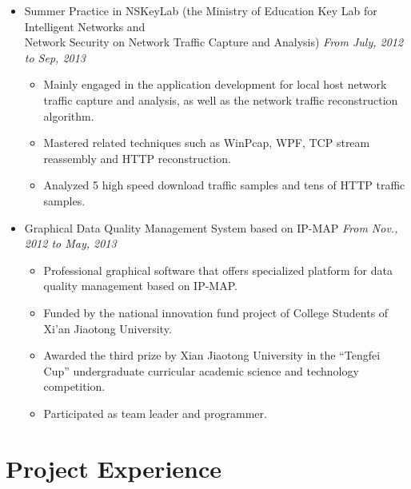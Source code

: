 \documentclass[letterpaper,11pt]{article}
\newenvironment{extra}{}{}
\begin{document}
\begin{itemize}
\begin{extra}
    \item Summer Practice in NSKeyLab (the Ministry of Education Key Lab for Intelligent Networks and \\ Network
    Security on Network Traffic Capture and Analysis) \hfill \textit{From July, 2012 to Sep, 2013}
    \begin{itemize}
        \item Mainly engaged in the application development for local host network traffic capture and
analysis, as well as the network traffic reconstruction algorithm.
        \item Mastered related techniques such as WinPcap, WPF, TCP stream reassembly and HTTP reconstruction.
        \item Analyzed 5 high speed download traffic samples and tens of HTTP traffic samples.
    \end{itemize}
\end{extra}

\begin{extra}
    \item Graphical Data Quality Management System based on IP-MAP \hfill \textit{From Nov., 2012 to May,
2013}
    \begin{itemize}
        \item Professional graphical software that offers specialized platform for data quality management based on IP-MAP.
        \item Funded by the national innovation fund project of College Students of Xi’an Jiaotong University.
        \item Awarded the third prize by Xian Jiaotong University in the “Tengfei Cup” undergraduate
curricular academic science and technology competition.
        \item Participated as team leader and programmer.
    \end{itemize}
\end{extra}

\end{itemize}


\section{Project Experience}
\end{document}
